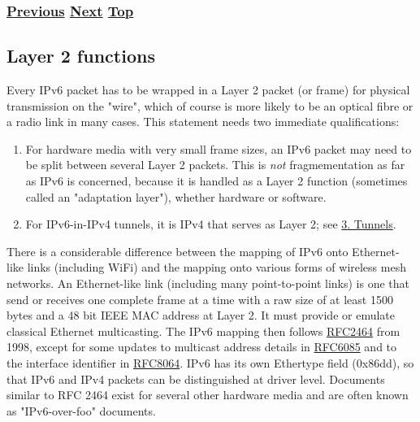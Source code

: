 \documentclass[
]{article}
\begin{document}
\subsubsection{\texorpdfstring{\hyperref[packet-format]{Previous}
\hyperref[layer-2-functions]{Next}
\hyperref[ipv6-basic-technology]{Top}}{Previous Next Top}}\label{previous-next-top-7}

\pagebreak

\subsection{Layer 2 functions}\label{layer-2-functions}

Every IPv6 packet has to be wrapped in a Layer 2 packet (or frame) for
physical transmission on the "wire", which of course is more likely to
be an optical fibre or a radio link in many cases. This statement needs
two immediate qualifications:

\begin{enumerate}
\def\labelenumi{\arabic{enumi}.}
\item
  For hardware media with very small frame sizes, an IPv6 packet may
  need to be split between several Layer 2 packets. This is \emph{not}
  fragmementation as far as IPv6 is concerned, because it is handled as
  a Layer 2 function (sometimes called an "adaptation layer"), whether
  hardware or software.
\item
  For IPv6-in-IPv4 tunnels, it is IPv4 that serves as Layer 2; see
  \hyperref[tunnels]{3. Tunnels}.
\end{enumerate}

There is a considerable difference between the mapping of IPv6 onto
Ethernet-like links (including WiFi) and the mapping onto various forms
of wireless mesh networks. An Ethernet-like link (including many
point-to-point links) is one that send or receives one complete frame at
a time with a raw size of at least 1500 bytes and a 48 bit IEEE MAC
address at Layer 2. It must provide or emulate classical Ethernet
multicasting. The IPv6 mapping then follows
\href{https://www.rfc-editor.org/info/rfc2464}{RFC2464} from 1998,
except for some updates to multicast address details in
\href{https://www.rfc-editor.org/info/rfc6085}{RFC6085} and to the
interface identifier in
\href{https://www.rfc-editor.org/info/rfc8064}{RFC8064}. IPv6 has its
own Ethertype field (0x86dd), so that IPv6 and IPv4 packets can be
distinguished at driver level. Documents similar to RFC 2464 exist for
several other hardware media and are often known as "IPv6-over-foo"
documents.
\end{document}
